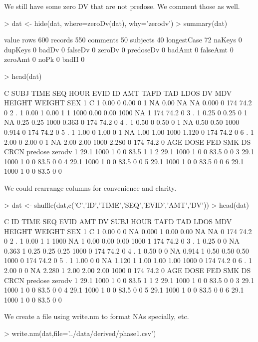 We still have some zero DV that are not predose.  We comment those as well.
\begin{Schunk}
\begin{Sinput}
> dat <- hide(dat, where=zeroDv(dat), why='zerodv')
> summary(dat)
\end{Sinput}
\begin{Soutput}
            value
rows          600
records       550
comments       50
subjects       40
longestCase    72
naKeys          0
dupKeys         0
badDv           0
falseDv         0
zeroDv          0
predoseDv       0
badAmt          0
falseAmt        0
zeroAmt         0
noPk            0
badII           0
\end{Soutput}
\begin{Sinput}
> head(dat)
\end{Sinput}
\begin{Soutput}
  C SUBJ TIME SEQ HOUR EVID ID  AMT TAFD  TAD LDOS    DV MDV HEIGHT WEIGHT SEX
1 C    1 0.00   0 0.00    0  1   NA 0.00   NA   NA 0.000   0    174   74.2   0
2 .    1 0.00   1 0.00    1  1 1000 0.00 0.00 1000    NA   1    174   74.2   0
3 .    1 0.25   0 0.25    0  1   NA 0.25 0.25 1000 0.363   0    174   74.2   0
4 .    1 0.50   0 0.50    0  1   NA 0.50 0.50 1000 0.914   0    174   74.2   0
5 .    1 1.00   0 1.00    0  1   NA 1.00 1.00 1000 1.120   0    174   74.2   0
6 .    1 2.00   0 2.00    0  1   NA 2.00 2.00 1000 2.280   0    174   74.2   0
   AGE DOSE FED SMK DS CRCN predose zerodv
1 29.1 1000   1   0  0 83.5       1      1
2 29.1 1000   1   0  0 83.5       0      0
3 29.1 1000   1   0  0 83.5       0      0
4 29.1 1000   1   0  0 83.5       0      0
5 29.1 1000   1   0  0 83.5       0      0
6 29.1 1000   1   0  0 83.5       0      0
\end{Soutput}
\end{Schunk}
We could rearrange columns for convenience and clarity.
\begin{Schunk}
\begin{Sinput}
> dat <- shuffle(dat,c('C','ID','TIME','SEQ','EVID','AMT','DV'))
> head(dat)
\end{Sinput}
\begin{Soutput}
  C ID TIME SEQ EVID  AMT    DV SUBJ HOUR TAFD  TAD LDOS MDV HEIGHT WEIGHT SEX
1 C  1 0.00   0    0   NA 0.000    1 0.00 0.00   NA   NA   0    174   74.2   0
2 .  1 0.00   1    1 1000    NA    1 0.00 0.00 0.00 1000   1    174   74.2   0
3 .  1 0.25   0    0   NA 0.363    1 0.25 0.25 0.25 1000   0    174   74.2   0
4 .  1 0.50   0    0   NA 0.914    1 0.50 0.50 0.50 1000   0    174   74.2   0
5 .  1 1.00   0    0   NA 1.120    1 1.00 1.00 1.00 1000   0    174   74.2   0
6 .  1 2.00   0    0   NA 2.280    1 2.00 2.00 2.00 1000   0    174   74.2   0
   AGE DOSE FED SMK DS CRCN predose zerodv
1 29.1 1000   1   0  0 83.5       1      1
2 29.1 1000   1   0  0 83.5       0      0
3 29.1 1000   1   0  0 83.5       0      0
4 29.1 1000   1   0  0 83.5       0      0
5 29.1 1000   1   0  0 83.5       0      0
6 29.1 1000   1   0  0 83.5       0      0
\end{Soutput}
\end{Schunk}
We create a file using write.nm to format NAs specially, etc.
\begin{Schunk}
\begin{Sinput}
> write.nm(dat,file='../data/derived/phase1.csv')
\end{Sinput}
\end{Schunk}





